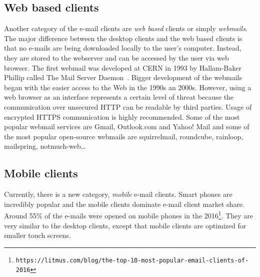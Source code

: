 \subsection{Web based clients}
Another category of the e-mail clients are \emph{web based} clients or simply \emph{webmails}. The major difference between the desktop clients and the web based clients is that no e-mails are being downloaded locally to the user's computer. Instead, they are stored to the webserver and can be accessed by the user via web browser.
The first webmail was developed at CERN in 1993 by Hallam-Baker Phillip called The Mail Server Daemon~\cite{cern-mail}. Bigger development of the webmails began with the easier access to the Web in the 1990s an 2000s. 
However, using a web browser as an interface represents a certain level of threat because the communication over unsecured HTTP can be readable by third parties. Usage of encrypted HTTPS communication is highly recommended.
Some of the most popular webmail services are Gmail, Outlook.com and Yahoo! Mail and some of the most popular open-source webmails are squirrelmail, roundcube, rainloop, mailspring, notmuch-web\dots

\subsection{Mobile clients}
Currently, there is a new category, \emph{mobile} e-mail clients. Smart phones are incredibly popular and the mobile clients dominate e-mail client market share. Around 55\% of the e-mails were opened on mobile phones in the 2016\footnote{\texttt{https://litmus.com/blog/the-top-10-most-popular-email-clients-of-2016}}. They are very similar to the desktop clients, except that mobile clients are optimized for smaller touch screens.
